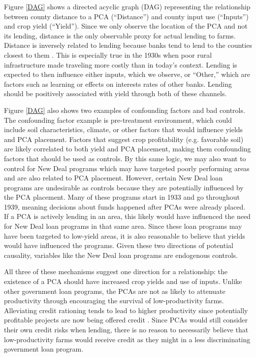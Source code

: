 \documentclass[12pt]{article}
\begin{document}
Figure \ref{DAG} shows a directed acyclic graph (DAG) representing the relationship between county distance to a PCA (``Distance'') and county input use (``Inputs'') and crop yield (``Yield'').
Since we only observe the location of the PCA and not its lending, distance is the only observable proxy for actual lending to farms.
Distance is inversely related to lending because banks tend to lend to the counties closest to them \citep{agarwal2010distance,degryse2005distance}.
This is especially true in the 1930s when poor rural infrastructure made traveling more costly than in today's context.
Lending is expected to then influence either inputs, which we observe, or ``Other,'' which are factors such as learning or effects on interests rates of other banks. 
Lending should be positively associated with yield through both of these channels.

Figure \ref{DAG} also shows two examples of confounding factors and bad controls.
The confounding factor example is pre-treatment environment, which could include soil characteristics, climate, or other factors that would influence yields and PCA placement.
Factors that suggest crop profitability (e.g. favorable soil) are likely correlated to both yield and PCA placement, making them confounding factors that should be used as controls.
By this same logic, we may also want to control for New Deal programs which may have targeted poorly performing areas and are also related to PCA placement.
However, certain New Deal loan programs are undesirable as controls because they are potentially influenced by the PCA placement.
Many of these programs start in 1933 and go throughout 1939, meaning decisions about funds happened after PCAs were already placed.
If a PCA is actively lending in an area, this likely would have influenced the need for New Deal loan programs in that same area.
Since these loan programs may have been targeted to low-yield areas, it is also reasonable to believe that yields would have influenced the programs.
Given these two directions of potential causality, variables like the New Deal loan programs are endogenous controls.

All three of these mechanisms suggest one direction for a relationship: the existence of a PCA should have increased crop yields and use of inputs.
Unlike other government loan programs, the PCAs are not as likely to attenuate productivity through encouraging the survival of low-productivity farms.
Alleviating credit rationing tends to lead to higher productivity since potentially profitable projects are now being offered credit \citep{Bencivenga1993}. 
Since PCAs would still consider their own credit risks when lending, there is no reason to necessarily believe that low-productivity farms would receive credit as they might in a less discriminating government loan program.
\end{document}

